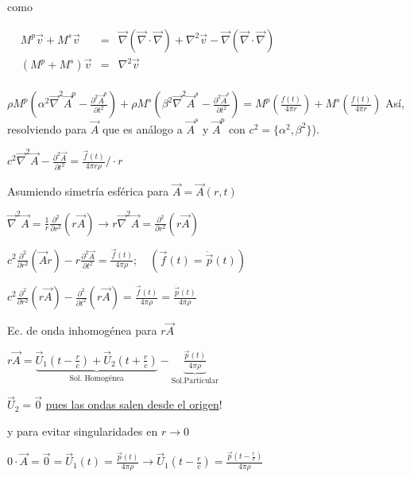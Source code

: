 \documentclass[a4paper,12pt]{article}
\begin{document}
$\quad$

como 

$
\begin{array}{rcllcl}
    &M^p\vec v+M^s\vec v&=&\vec\nabla(\vec\nabla\cdot\vec\nabla)+\nabla^2\vec v-\vec\nabla(\vec\nabla\cdot\vec\nabla)
    \\
    &(M^p + M^s)\vec v&=&\nabla^2\vec v\\
    &
\end{array}
$

$\rho M^p\left(\alpha^2\vec\nabla^2\vec A^p-\frac{\partial^2\vec A^p}{\partial t^2}\right) + \rho M^s\left(\beta^2\vec\nabla^2\vec A ^s - \frac{\partial^2\vec A^s}{\partial t^2}\right)=M^p\left(\frac{f(t)}{4\pi r}\right)+M^s\left(\frac{f(t)}{4\pi r}\right)
$
Así, resolviendo para $\vec A$ que es análogo a $\vec A^s$ y $\vec A^p$ con $c^2=\{\alpha^2,\beta^2\}$).
\begin{center}

$
c^2\vec\nabla^2\vec A - \frac{\partial^2\vec A}{\partial t^2}=\frac{\vec f(t)}{4\pi r\rho}\Bigg/\cdot r 
$
\end{center}
\begin{center}
Asumiendo simetría esférica para $\vec A=\vec A(r,t)$
\end{center}

$\vec\nabla^2\vec A=\frac{1}{r}\frac{\partial^2}{\partial r^2}(r\vec A)\rightarrow r\vec\nabla^2\vec A=\frac{\partial^2}{\partial r^2}(r\vec A)
$

$c^2\frac{\partial^2}{\partial r^2}(\vec A r)-r\frac{\partial^2\vec A}{\partial t^2}=\frac{\vec f(t)}{4\pi \rho};\quad(\vec f(t)=\ddot{\vec p }(t))
$

$c^2\frac{\partial^2}{\partial r^2}(r\vec A )-\frac{\partial^2}{\partial t^2}(r\vec A)=\frac{\vec f(t)}{4\pi \rho}=\frac{\ddot{\vec p }(t)}{4\pi \rho}
$
\begin{center}
Ec. de onda inhomogénea para $r\vec A$
\end{center}

$r\vec A=\underbrace{\vec U_1\left(t-\frac{r}{c}\right)+\vec U_2\left(t+\frac{r}{c}\right)}_{\text{Sol. Homogénea}}-\underbrace{\frac{\vec p (t)}{4\pi\rho}}_{\text{Sol.Particular}}$
\begin{center}
$\vec U_2=\vec0$ \underline{pues las ondas salen desde el origen}! 

y para evitar singularidades en $r\rightarrow0$
\end{center}

$0\cdot\vec A=\vec0=\vec U_1 (t)=\frac{\vec p (t)}{4\pi\rho}\rightarrow\vec U_1\left(t-\frac{r}{c}\right)=\frac{\vec p \left(t-\frac{r}{c}\right)}{4\pi\rho}$
\end{document}
